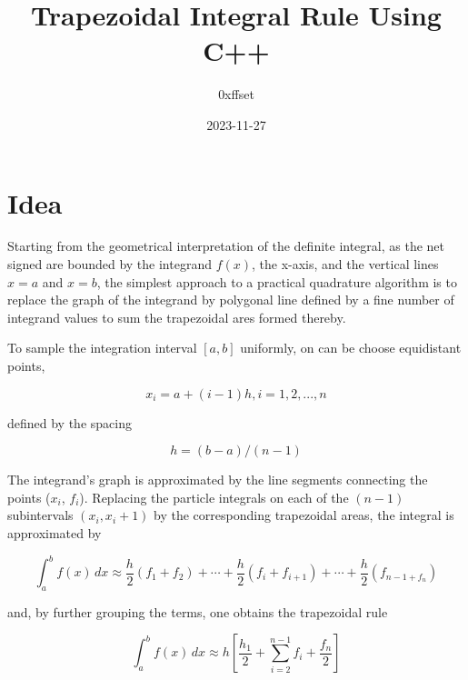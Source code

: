 \title{Trapezoidal Integral Rule Using C++}
\author{0xffset}
\date{2023-11-27}

\maketitle

\section{Idea}

Starting from the geometrical interpretation of the definite integral, as the net signed are bounded by the integrand $f(x)$, the x-axis, and the vertical lines $x=a$ and $x=b$, the simplest approach to a practical quadrature algorithm is to replace the graph of the integrand by polygonal line defined
by a fine number of integrand values to sum the trapezoidal ares formed thereby.

To sample the integration interval $[a,b]$ uniformly, on can be choose equidistant points, 

\begin{equation*}
    x_i = a + (i -1)h, i = 1,2,...,n
\end{equation*}

defined by the spacing 

\begin{equation*}
    h = (b - a)/(n-1)
\end{equation*}

\begin{trapezoidalplot}
\end{trapezoidalplot}


The integrand's graph is approximated by the line segments connecting the points ($x_i$, $f_i$). 
Replacing the particle integrals on each of the $(n-1)$ subintervals $(x_i, x_i + 1)$ by the corresponding trapezoidal areas, the integral is approximated by



\begin{equation*}
\int_a^b f(x)\,dx \approx \frac{h}{2}(f_1 + f_2) + \cdots + \frac{h}{2}(f_i+f_{i+1}) + \cdots + \frac{h}{2}(f_{n-1 + f_n})
\end{equation*}

and, by further grouping the terms, one obtains the trapezoidal rule 

\begin{equation}
    \int_a^b f(x)\,dx \approx h \left[ \frac{h_1}{2} + \sum_{i=2}^{n-1} f_i + \frac{f_n}{2} \right]
\end{equation}

